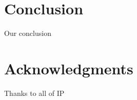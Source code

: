 \documentclass{sigchi}
\begin{document}
\section{Conclusion}

Our conclusion

\section{Acknowledgments}

Thanks to all of IP

%
%
%
%
%
\balance




\end{document}
